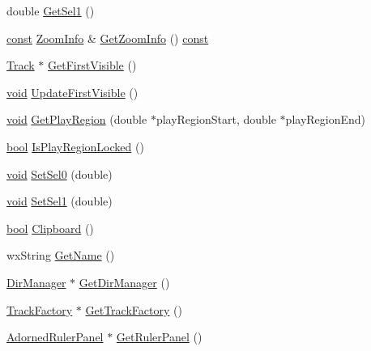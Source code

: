 \begin{DoxyCompactItemize}
\item 
double \hyperlink{class_audacity_project_afa447a603395bbf27daa2ed4e0e6379f}{Get\+Sel1} ()
\item 
\hyperlink{getopt1_8c_a2c212835823e3c54a8ab6d95c652660e}{const} \hyperlink{class_zoom_info}{Zoom\+Info} \& \hyperlink{class_audacity_project_a19f91332612e29135371b1c027472a88}{Get\+Zoom\+Info} () \hyperlink{getopt1_8c_a2c212835823e3c54a8ab6d95c652660e}{const} 
\item 
\hyperlink{class_track}{Track} $\ast$ \hyperlink{class_audacity_project_aba18bc5ad1c7a45e0beab73e9b6387a1}{Get\+First\+Visible} ()
\item 
\hyperlink{sound_8c_ae35f5844602719cf66324f4de2a658b3}{void} \hyperlink{class_audacity_project_a94905716d15460f18c2827abedaeae38}{Update\+First\+Visible} ()
\item 
\hyperlink{sound_8c_ae35f5844602719cf66324f4de2a658b3}{void} \hyperlink{class_audacity_project_a14f015b24a139589e118b23d3d1bb55d}{Get\+Play\+Region} (double $\ast$play\+Region\+Start, double $\ast$play\+Region\+End)
\item 
\hyperlink{mac_2config_2i386_2lib-src_2libsoxr_2soxr-config_8h_abb452686968e48b67397da5f97445f5b}{bool} \hyperlink{class_audacity_project_abba7d8ac67a2f5c5867771aeb9f63405}{Is\+Play\+Region\+Locked} ()
\item 
\hyperlink{sound_8c_ae35f5844602719cf66324f4de2a658b3}{void} \hyperlink{class_audacity_project_a4d97279f9ddf37332418c32d1079ff62}{Set\+Sel0} (double)
\item 
\hyperlink{sound_8c_ae35f5844602719cf66324f4de2a658b3}{void} \hyperlink{class_audacity_project_a901e075ad4da1712207988af157b06de}{Set\+Sel1} (double)
\item 
\hyperlink{mac_2config_2i386_2lib-src_2libsoxr_2soxr-config_8h_abb452686968e48b67397da5f97445f5b}{bool} \hyperlink{class_audacity_project_a9266796d7113700fcb554a1e91bd0b6b}{Clipboard} ()
\item 
wx\+String \hyperlink{class_audacity_project_a5afd1b5628e48b849342d8e9290c850c}{Get\+Name} ()
\item 
\hyperlink{class_dir_manager}{Dir\+Manager} $\ast$ \hyperlink{class_audacity_project_aa7aadbb20085c8c8631d17e3d81d02bb}{Get\+Dir\+Manager} ()
\item 
\hyperlink{class_track_factory}{Track\+Factory} $\ast$ \hyperlink{class_audacity_project_a05d3d9ac4cafb63f987d3b2306c9059d}{Get\+Track\+Factory} ()
\item 
\hyperlink{class_adorned_ruler_panel}{Adorned\+Ruler\+Panel} $\ast$ \hyperlink{class_audacity_project_ad937a798d51c487dff6695499304deca}{Get\+Ruler\+Panel} ()

\end{DoxyCompactItemize}
